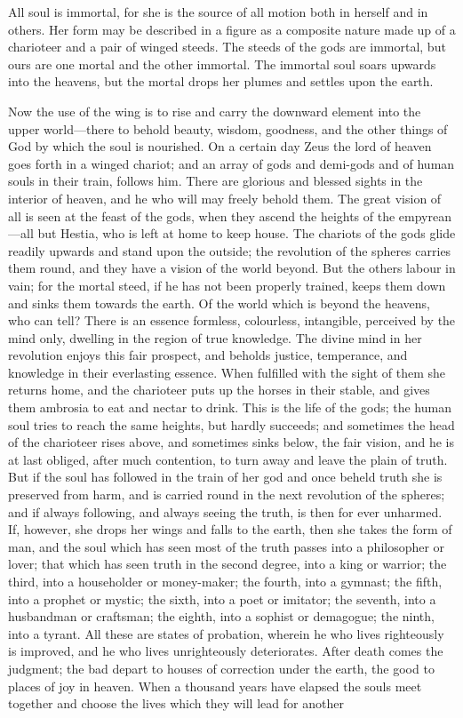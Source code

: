 \documentclass[11pt,letter]{article}
\begin{document}
\par  All soul is immortal, for she is the source of all motion both in herself and in others. Her form may be described in a figure as a composite nature made up of a charioteer and a pair of winged steeds. The steeds of the gods are immortal, but ours are one mortal and the other immortal. The immortal soul soars upwards into the heavens, but the mortal drops her plumes and settles upon the earth.

\par  Now the use of the wing is to rise and carry the downward element into the upper world—there to behold beauty, wisdom, goodness, and the other things of God by which the soul is nourished. On a certain day Zeus the lord of heaven goes forth in a winged chariot; and an array of gods and demi-gods and of human souls in their train, follows him. There are glorious and blessed sights in the interior of heaven, and he who will may freely behold them. The great vision of all is seen at the feast of the gods, when they ascend the heights of the empyrean—all but Hestia, who is left at home to keep house. The chariots of the gods glide readily upwards and stand upon the outside; the revolution of the spheres carries them round, and they have a vision of the world beyond. But the others labour in vain; for the mortal steed, if he has not been properly trained, keeps them down and sinks them towards the earth. Of the world which is beyond the heavens, who can tell? There is an essence formless, colourless, intangible, perceived by the mind only, dwelling in the region of true knowledge. The divine mind in her revolution enjoys this fair prospect, and beholds justice, temperance, and knowledge in their everlasting essence. When fulfilled with the sight of them she returns home, and the charioteer puts up the horses in their stable, and gives them ambrosia to eat and nectar to drink. This is the life of the gods; the human soul tries to reach the same heights, but hardly succeeds; and sometimes the head of the charioteer rises above, and sometimes sinks below, the fair vision, and he is at last obliged, after much contention, to turn away and leave the plain of truth. But if the soul has followed in the train of her god and once beheld truth she is preserved from harm, and is carried round in the next revolution of the spheres; and if always following, and always seeing the truth, is then for ever unharmed. If, however, she drops her wings and falls to the earth, then she takes the form of man, and the soul which has seen most of the truth passes into a philosopher or lover; that which has seen truth in the second degree, into a king or warrior; the third, into a householder or money-maker; the fourth, into a gymnast; the fifth, into a prophet or mystic; the sixth, into a poet or imitator; the seventh, into a husbandman or craftsman; the eighth, into a sophist or demagogue; the ninth, into a tyrant. All these are states of probation, wherein he who lives righteously is improved, and he who lives unrighteously deteriorates. After death comes the judgment; the bad depart to houses of correction under the earth, the good to places of joy in heaven. When a thousand years have elapsed the souls meet together and choose the lives which they will lead for another 
\end{document}
